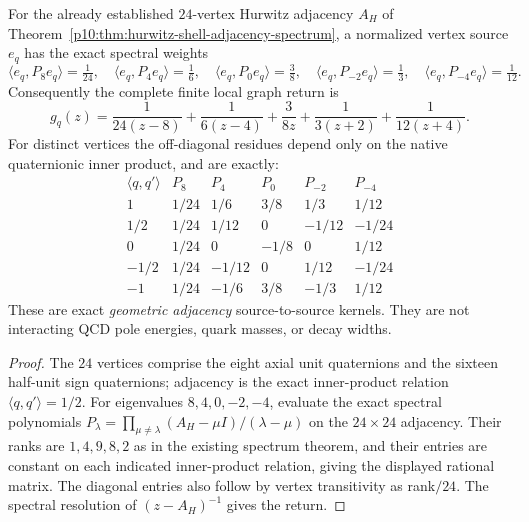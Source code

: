 \documentclass[12pt,a4paper]{article}
\begin{document}
\begin{corollary}
\label{p10:cor:v377-hurwitz-local-spectral-return}
For the already established $24$-vertex Hurwitz adjacency $A_H$ of
Theorem~\ref{p10:thm:hurwitz-shell-adjacency-spectrum}, a normalized
vertex source $e_q$ has the exact spectral weights
\[
\boxed{\langle e_q,P_8e_q\rangle=\tfrac1{24},\quad
 \langle e_q,P_4e_q\rangle=\tfrac16,\quad
 \langle e_q,P_0e_q\rangle=\tfrac38,\quad
 \langle e_q,P_{-2}e_q\rangle=\tfrac13,\quad
 \langle e_q,P_{-4}e_q\rangle=\tfrac1{12}.}
\]
Consequently the complete finite local graph return is
\[
 \boxed{g_q(z)=\frac{1}{24(z-8)}+\frac{1}{6(z-4)}
 +\frac{3}{8z}+\frac{1}{3(z+2)}+\frac{1}{12(z+4)}.}
\]
For distinct vertices the off-diagonal residues depend only on the
native quaternionic inner product, and are exactly:
\[
\begin{array}{c|rrrrr}
\langle q,q'\rangle&P_8&P_4&P_0&P_{-2}&P_{-4}\\\hline
1&1/24&1/6&3/8&1/3&1/12\\
1/2&1/24&1/12&0&-1/12&-1/24\\
0&1/24&0&-1/8&0&1/12\\
-1/2&1/24&-1/12&0&1/12&-1/24\\
-1&1/24&-1/6&3/8&-1/3&1/12
\end{array}
\]
These are exact \emph{geometric adjacency} source-to-source kernels.
They are not interacting QCD pole energies, quark masses, or decay widths.
\end{corollary}
\begin{proof}
The $24$ vertices comprise the eight axial unit quaternions and
the sixteen half-unit sign quaternions; adjacency is the exact
inner-product relation $\langle q,q'\rangle=1/2$.
For eigenvalues $8,4,0,-2,-4$, evaluate the exact spectral
polynomials $P_\lambda=\prod_{\mu\ne\lambda}
(A_H-\mu I)/(\lambda-\mu)$ on the $24\times24$ adjacency.
Their ranks are $1,4,9,8,2$ as in the existing spectrum theorem,
and their entries are constant on each indicated inner-product
relation, giving the displayed rational matrix. The diagonal
entries also follow by vertex transitivity as rank$/24$.
The spectral resolution of $(z-A_H)^{-1}$ gives the return.
\end{proof}
\end{document}
